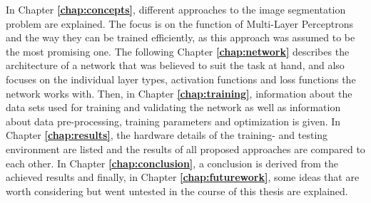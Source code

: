 \noindent In Chapter \textbf{\ref{chap:concepts}}, different approaches to the image segmentation problem are explained. The focus is on the function of Multi-Layer Perceptrons and the way they can be trained efficiently, as this approach was assumed to be the most promising one. The following Chapter \textbf{\ref{chap:network}} describes the architecture of a network that was believed to suit the task at hand, and also focuses on the individual layer types, activation functions and loss functions the network works with. Then, in Chapter \textbf{\ref{chap:training}}, information about the data sets used for training and validating the network as well as information about data pre-processing, training parameters and optimization is given. In Chapter \textbf{\ref{chap:results}}, the hardware details of the training- and testing environment are listed and the results of all proposed approaches are compared to each other. In Chapter \textbf{\ref{chap:conclusion}}, a conclusion is derived from the achieved results and finally, in Chapter \textbf{\ref{chap:futurework}}, some ideas that are worth considering but went untested in the course of this thesis are explained. 